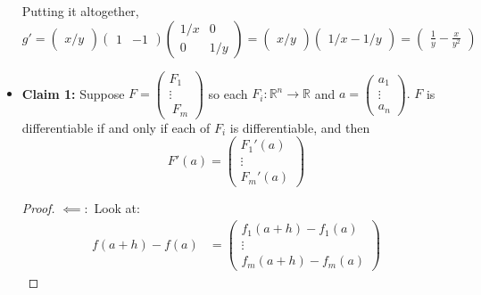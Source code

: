 \begin{itemize}
\begin{example}
        Putting it altogether,
        \begin{equation}
            g' = \begin{pmatrix}
                x/y
            \end{pmatrix}\begin{pmatrix}
                1 & -1
            \end{pmatrix}\begin{pmatrix}
                1/x & 0 \\ 
                0 & 1/y
            \end{pmatrix} = \begin{pmatrix}
                x/y
            \end{pmatrix}\begin{pmatrix}
                1/x - 1/y
            \end{pmatrix} = \begin{pmatrix}
                \frac{1}{y} - \frac{x}{y^2}
            \end{pmatrix}
        \end{equation}
    \end{example}
    \item \textbf{Claim 1:} Suppose $F=\begin{pmatrix}
        F_1 \\ \vdots \\\ F_m
    \end{pmatrix}$ so each $F_i:\mathbb{R}^n \rightarrow \mathbb{R}$ and $a = \begin{pmatrix}
        a_1 \\ \vdots \\ a_n
    \end{pmatrix}.$ $F$ is differentiable if and only if each of $F_i$ is differentiable, and then
    \begin{equation}
        F'(a) = \begin{pmatrix}
            F_1'(a) \\ 
            \vdots \\ 
            F_m'(a)
        \end{pmatrix}
    \end{equation} 
    \begin{proof}
        $\impliedby:$ Look at: 
        \begin{align}
            f(a+h)-f(a) &= \begin{pmatrix}
                f_1(a+h)-f_1(a) \\ \vdots \\ f_m(a+h) - f_m(a)

\end{pmatrix}
\end{align}
\end{proof}
\end{itemize}
